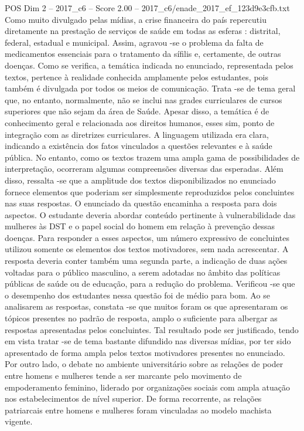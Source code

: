 \begin{textsample}{POS Dim 2 – 2017\_c6 – Score 2.00 – 2017\_c6/enade\_2017\_ef\_123d9e3cfb.txt}
Como muito divulgado pelas mídias, a crise financeira do país repercutiu diretamente na prestação de serviços de saúde em todas as esferas : distrital, federal, estadual e municipal.
Assim, agravou -se o problema da falta de medicamentos essenciais para o tratamento da sífilis e, certamente, de outras doenças.
Como se verifica, a temática indicada no enunciado, representada pelos textos, pertence à realidade conhecida amplamente pelos estudantes, pois também é divulgada por todos os meios de comunicação.
Trata -se de tema geral que, no entanto, normalmente, não se inclui nas grades curriculares de cursos superiores que não sejam da área de Saúde.
Apesar disso, a temática é de conhecimento geral e relacionada aos direitos humanos, esses sim, ponto de integração com as diretrizes curriculares.
A linguagem utilizada era clara, indicando a existência dos fatos vinculados a questões relevantes e à saúde pública.
No entanto, como os textos trazem uma ampla gama de possibilidades de interpretação, ocorreram algumas compreensões diversas das esperadas.
Além disso, ressalta -se que a amplitude dos textos disponibilizados no enunciado fornece elementos que poderiam ser simplesmente reproduzidos pelos concluintes nas suas respostas.
O enunciado da questão encaminha a resposta para dois aspectos.
O estudante deveria abordar conteúdo pertinente à vulnerabilidade das mulheres às DST e o papel social do homem em relação à prevenção dessas doenças.
Para responder a esses aspectos, um número expressivo de concluintes utilizou somente os elementos dos textos motivadores, sem nada acrescentar.
A resposta deveria conter também uma segunda parte, a indicação de duas ações voltadas para o público masculino, a serem adotadas no âmbito das políticas públicas de saúde ou de educação, para a redução do problema.
Verificou -se que o desempenho dos estudantes nessa questão foi de médio para bom.
Ao se analisarem as respostas, constata -se que muitos foram os que apresentaram os tópicos presentes no padrão de resposta, amplo o suficiente para albergar as respostas apresentadas pelos concluintes.
Tal resultado pode ser justificado, tendo em vista tratar -se de tema bastante difundido nas diversas mídias, por ter sido apresentado de forma ampla pelos textos motivadores presentes no enunciado.
Por outro lado, o debate no ambiente universitário sobre as relações de poder entre homens e mulheres tende a ser marcante pelo movimento de empoderamento feminino, liderado por organizações sociais com ampla atuação nos estabelecimentos de nível superior.
De forma recorrente, as relações patriarcais entre homens e mulheres foram vinculadas ao modelo machista vigente.

\end{textsample}
